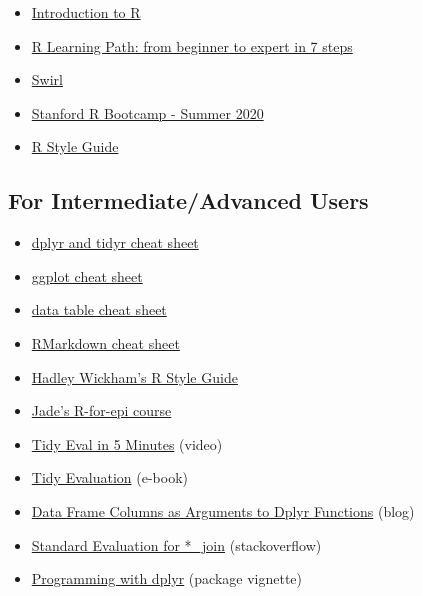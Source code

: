 \documentclass[
]{book}
\providecommand{\tightlist}{%
  \setlength{\itemsep}{0pt}\setlength{\parskip}{0pt}}
\begin{document}
\begin{itemize}
\tightlist
\item
  \href{https://monashdatafluency.github.io/r-intro-2/}{Introduction to R}
\item
  \href{https://www.kdnuggets.com/2016/03/datacamp-r-learning-path-7-steps.html}{R Learning Path: from beginner to expert in 7 steps}
\item
  \href{https://swirlstats.com/students.html}{Swirl}
\item
  \href{https://biox-rbootcamp.github.io/material}{Stanford R Bootcamp - Summer 2020}
\item
  \href{http://adv-r.had.co.nz/Style.html}{R Style Guide}
\end{itemize}

\subsection{For Intermediate/Advanced Users}\label{for-intermediateadvanced-users}

\begin{itemize}
\tightlist
\item
  \href{https://www.rstudio.com/wp-content/uploads/2015/02/data-wrangling-cheatsheet.pdf}{dplyr and tidyr cheat sheet}
\item
  \href{https://www.rstudio.com/wp-content/uploads/2015/03/ggplot2-cheatsheet.pdf}{ggplot cheat sheet}
\item
  \href{https://s3.amazonaws.com/assets.datacamp.com/blog_assets/datatable_Cheat_Sheet_R.pdf}{data table cheat sheet}
\item
  \href{https://www.rstudio.com/wp-content/uploads/2015/02/rmarkdown-cheatsheet.pdf}{RMarkdown cheat sheet}
\item
  \href{http://adv-r.had.co.nz/Style.html}{Hadley Wickham's R Style Guide}
\item
  \href{https://ucb-epi-r.github.io}{Jade's R-for-epi course}
\item
  \href{https://www.youtube.com/watch?v=nERXS3ssntw}{Tidy Eval in 5 Minutes} (video)
\item
  \href{https://tidyeval.tidyverse.org/index.html}{Tidy Evaluation} (e-book)
\item
  \href{https://www.brodrigues.co/blog/2016-07-18-data-frame-columns-as-arguments-to-dplyr-functions/}{Data Frame Columns as Arguments to Dplyr Functions} (blog)
\item
  \href{https://stackoverflow.com/questions/28125816/r-standard-evaluation-for-join-dplyr}{Standard Evaluation for *\_join} (stackoverflow)
\item
  \href{https://dplyr.tidyverse.org/articles/programming.html}{Programming with dplyr} (package vignette)
\end{itemize}
\end{document}
